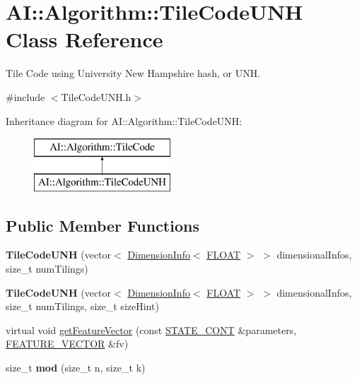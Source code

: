 \hypertarget{classAI_1_1Algorithm_1_1TileCodeUNH}{\section{A\+I\+:\+:Algorithm\+:\+:Tile\+Code\+U\+N\+H Class Reference}
\label{classAI_1_1Algorithm_1_1TileCodeUNH}
}


Tile Code using University New Hampshire hash, or U\+N\+H.  




{\ttfamily \#include $<$Tile\+Code\+U\+N\+H.\+h$>$}

Inheritance diagram for A\+I\+:\+:Algorithm\+:\+:Tile\+Code\+U\+N\+H\+:\begin{figure}[H]
\begin{center}
\leavevmode
\includegraphics[height=2.000000cm]{classAI_1_1Algorithm_1_1TileCodeUNH}
\end{center}
\end{figure}
\subsection*{Public Member Functions}
\begin{DoxyCompactItemize}
\item 
\hypertarget{classAI_1_1Algorithm_1_1TileCodeUNH_abcbd8f8e4bcc48dda33a9e98a012fa5d}{{\bfseries Tile\+Code\+U\+N\+H} (vector$<$ \hyperlink{classAI_1_1Algorithm_1_1DimensionInfo}{Dimension\+Info}$<$ \hyperlink{namespaceAI_a41b74884a20833db653dded3918e05c3}{F\+L\+O\+A\+T} $>$ $>$ dimensional\+Infos, size\+\_\+t num\+Tilings)}\label{classAI_1_1Algorithm_1_1TileCodeUNH_abcbd8f8e4bcc48dda33a9e98a012fa5d}

\item 
\hypertarget{classAI_1_1Algorithm_1_1TileCodeUNH_ac6d35486b3f5e94a6a6d95dd4a5e1e14}{{\bfseries Tile\+Code\+U\+N\+H} (vector$<$ \hyperlink{classAI_1_1Algorithm_1_1DimensionInfo}{Dimension\+Info}$<$ \hyperlink{namespaceAI_a41b74884a20833db653dded3918e05c3}{F\+L\+O\+A\+T} $>$ $>$ dimensional\+Infos, size\+\_\+t num\+Tilings, size\+\_\+t size\+Hint)}\label{classAI_1_1Algorithm_1_1TileCodeUNH_ac6d35486b3f5e94a6a6d95dd4a5e1e14}

\item 
virtual void \hyperlink{classAI_1_1Algorithm_1_1TileCodeUNH_a7b13840ff09b20ff2ad06965f3f4800f}{get\+Feature\+Vector} (const \hyperlink{namespaceAI_aff63ec21d97dd5f086fddbc3103f5707}{S\+T\+A\+T\+E\+\_\+\+C\+O\+N\+T} \&parameters, \hyperlink{namespaceAI_a23a39e1b301a5c1345fa508796940631}{F\+E\+A\+T\+U\+R\+E\+\_\+\+V\+E\+C\+T\+O\+R} \&fv)
\item 
\hypertarget{classAI_1_1Algorithm_1_1TileCodeUNH_a02daa0818beff76016b3d000a2c86b68}{size\+\_\+t {\bfseries mod} (size\+\_\+t n, size\+\_\+t k)}\label{classAI_1_1Algorithm_1_1TileCodeUNH_a02daa0818beff76016b3d000a2c86b68}

\end{DoxyCompactItemize}
